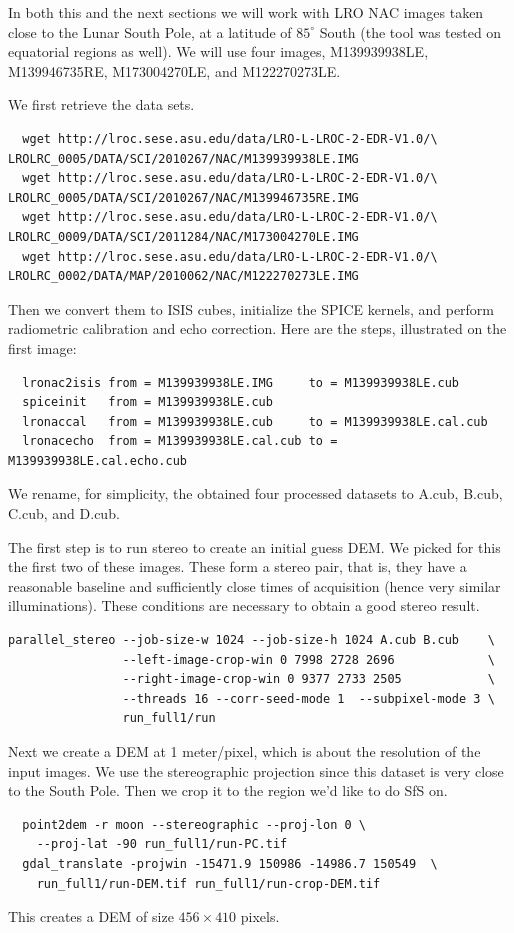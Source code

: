 In both this and the next sections we will work with LRO NAC images taken
close to the Lunar South Pole, at a latitude of $85^\circ$ South (the tool was
tested on equatorial regions as well). We will use four images,
M139939938LE, M139946735RE, M173004270LE, and M122270273LE.

We first retrieve the data sets.
\begin{verbatim}
  wget http://lroc.sese.asu.edu/data/LRO-L-LROC-2-EDR-V1.0/\
LROLRC_0005/DATA/SCI/2010267/NAC/M139939938LE.IMG
  wget http://lroc.sese.asu.edu/data/LRO-L-LROC-2-EDR-V1.0/\
LROLRC_0005/DATA/SCI/2010267/NAC/M139946735RE.IMG
  wget http://lroc.sese.asu.edu/data/LRO-L-LROC-2-EDR-V1.0/\
LROLRC_0009/DATA/SCI/2011284/NAC/M173004270LE.IMG
  wget http://lroc.sese.asu.edu/data/LRO-L-LROC-2-EDR-V1.0/\
LROLRC_0002/DATA/MAP/2010062/NAC/M122270273LE.IMG
\end{verbatim}

Then we convert them to ISIS cubes, initialize the SPICE kernels, and
perform radiometric calibration and echo correction. Here are the steps, 
illustrated on the first image:
\begin{verbatim}  
  lronac2isis from = M139939938LE.IMG     to = M139939938LE.cub
  spiceinit   from = M139939938LE.cub
  lronaccal   from = M139939938LE.cub     to = M139939938LE.cal.cub
  lronacecho  from = M139939938LE.cal.cub to = M139939938LE.cal.echo.cub
\end{verbatim}
We rename, for simplicity, the obtained four processed datasets to
A.cub, B.cub, C.cub, and D.cub.

The first step is to run stereo to create an initial guess DEM. We
picked for this the first two of these images. These form a stereo pair,
that is, they have a reasonable baseline and sufficiently close times of
acquisition (hence very similar illuminations). These conditions are
necessary to obtain a good stereo result.
\begin{verbatim}
parallel_stereo --job-size-w 1024 --job-size-h 1024 A.cub B.cub    \
                --left-image-crop-win 0 7998 2728 2696             \
                --right-image-crop-win 0 9377 2733 2505            \
                --threads 16 --corr-seed-mode 1  --subpixel-mode 3 \
                run_full1/run
\end{verbatim}
Next we create a DEM at 1 meter/pixel, which is about the resolution
of the input images. We use the stereographic projection since this
dataset is very close to the South Pole. Then we crop it to the region
we'd like to do SfS on.
\begin{verbatim}
  point2dem -r moon --stereographic --proj-lon 0 \
    --proj-lat -90 run_full1/run-PC.tif
  gdal_translate -projwin -15471.9 150986 -14986.7 150549  \
    run_full1/run-DEM.tif run_full1/run-crop-DEM.tif
\end{verbatim}
This creates a DEM of size $456 \times 410$ pixels.

